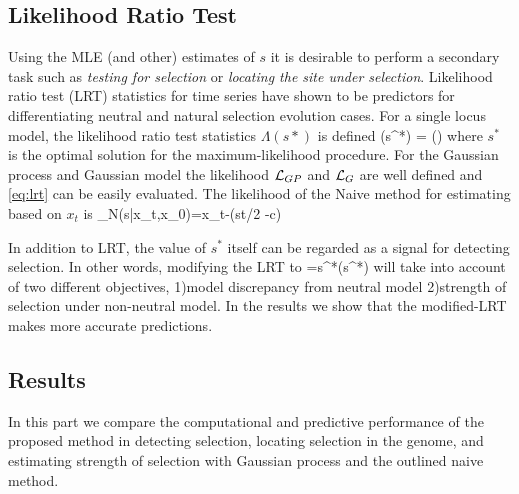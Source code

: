 \subsection{Likelihood Ratio Test}
Using the MLE (and other) estimates of $s$ it is desirable to perform a secondary task such as \emph{testing for selection} or \emph{locating the site under selection}. Likelihood ratio test (LRT) statistics for time series \cite{feder2014} have shown to be predictors for differentiating neutral and natural selection evolution cases. For a single locus model, the likelihood ratio test statistics $\Lambda(s*)$ is defined
\beq \label{eq:lrt}
\Lambda(s^*) = \log \left(\right)
\eeq
where $s^*$ is the optimal solution for the maximum-likelihood procedure. For the Gaussian process and Gaussian model the likelihood ${\cal L}_{GP}$ and ${\cal L}_G$ are well defined and \eqref{eq:lrt} can be easily evaluated. The likelihood of the Naive method for estimating based on $x_t$ is 
\beq
\Lc_N(s|x_t,x_0)=x_t-\sigma(st/2 -c)
\eeq

In addition to LRT, the value of $s^*$ itself can be regarded as a signal for detecting selection. In other words, modifying the LRT to
\beq
\Theta=s^*\Lambda(s^*)
\eeq
will take into account of two different objectives, 1)model discrepancy from neutral model 2)strength of selection under non-neutral model. In the  results we show that the modified-LRT makes more accurate predictions.

\subsection{Results}
In this part we compare the computational and predictive performance of the proposed method in detecting selection, locating selection in the genome, and estimating strength of selection with Gaussian process and the outlined naive method.

